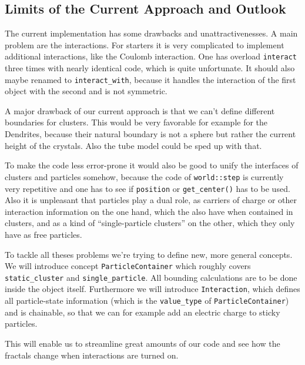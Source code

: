 \documentclass[twocolumn,10pt]{scrartcl}
\begin{document}
        \subsection{Limits of the Current Approach and Outlook}
            \label{sec-limits}
            The current implementation has some drawbacks and unattractivenesses. A main problem are the
            interactions. For starters it is very complicated to implement additional interactions, like the Coulomb
            interaction. One has overload \lstinline'interact' three times with nearly identical code, which is
            quite unfortunate. It should also maybe renamed to \lstinline'interact_with', because it handles the
            interaction of the first object with the second and is not symmetric.

            A major drawback of our current approach is that we can't define different boundaries for clusters. This
            would be very favorable for example for the Dendrites, because their natural boundary is not a sphere but
            rather the current height of the crystals. Also the tube model could be sped up with that.

            To make the code less error-prone it would also be good to unify the interfaces of clusters and particles
            somehow, because the code of \lstinline'world::step' is currently very repetitive and one has to see if
            \lstinline'position' or \lstinline'get_center()' has to be used. Also it is unpleasant that particles play
            a dual role, as carriers of charge or other interaction information on the one hand, which the also have
            when contained in clusters, and as a kind of "`single-particle clusters"' on the other, which they only
            have as free particles.

            To tackle all theses problems we're trying to define new, more general concepts. We will introduce concept
            \lstinline'ParticleContainer' which roughly covers \lstinline'static_cluster' and
            \lstinline'single_particle'. All bounding calculations are to be done inside the object itself. Furthermore
            we will introduce \lstinline'Interaction', which defines all particle-state information (which is the
            \lstinline'value_type' of \lstinline'ParticleContainer') and is chainable, so that we can for example add
            an electric charge to sticky particles.

            This will enable us to streamline great amounts of our code and see how the fractals change when
            interactions are turned on.
\end{document}

